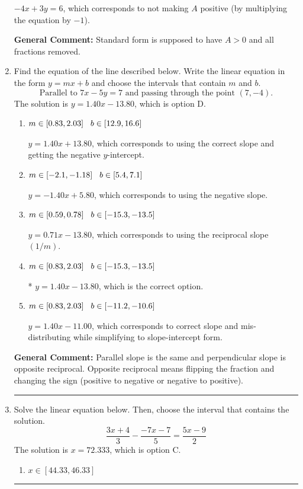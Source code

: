 \documentclass{extbook}[14pt]
\newcommand{\litem}[1]{\item #1

\rule{\textwidth}{0.4pt}}
\begin{document}
\begin{enumerate}
{\begin{enumerate}[label=\Alph*.]
 $-4x + 3y = 6$, which corresponds to not making $A$ positive (by multiplying the equation by $-1$).
\end{enumerate}

\textbf{General Comment:} Standard form is supposed to have $A > 0$ and all fractions removed.
}
\litem{
Find the equation of the line described below. Write the linear equation in the form $ y=mx+b $ and choose the intervals that contain $m$ and $b$.
\[ \text{Parallel to } 7 x - 5 y = 7 \text{ and passing through the point } (7, -4). \]The solution is \( y = 1.40x - 13.80 \), which is option D.\begin{enumerate}[label=\Alph*.]
\item \( m \in [0.83, 2.03] \hspace*{3mm} b \in [12.9, 16.6] \)

 $y = 1.40x + 13.80$, which corresponds to using the correct slope and getting the negative $y$-intercept.
\item \( m \in [-2.1, -1.18] \hspace*{3mm} b \in [5.4, 7.1] \)

 $y = -1.40x + 5.80$, which corresponds to using the negative slope.
\item \( m \in [0.59, 0.78] \hspace*{3mm} b \in [-15.3, -13.5] \)

 $y = 0.71x - 13.80$, which corresponds to using the reciprocal slope $(1/m)$.
\item \( m \in [0.83, 2.03] \hspace*{3mm} b \in [-15.3, -13.5] \)

* $y = 1.40x - 13.80$, which is the correct option.
\item \( m \in [0.83, 2.03] \hspace*{3mm} b \in [-11.2, -10.6] \)

 $y = 1.40x - 11.00$, which corresponds to correct slope and mis-distributing while simplifying to slope-intercept form.
\end{enumerate}

\textbf{General Comment:} Parallel slope is the same and perpendicular slope is opposite reciprocal. Opposite reciprocal means flipping the fraction and changing the sign (positive to negative or negative to positive).
}
\litem{
Solve the linear equation below. Then, choose the interval that contains the solution.
\[ \frac{3x + 4}{3} - \frac{-7x -7}{5} = \frac{5x -9}{2} \]The solution is \( x = 72.333 \), which is option C.\begin{enumerate}[label=\Alph*.]
\item \( x \in [44.33, 46.33] \)


\end{enumerate}}
\end{enumerate}
\end{document}
